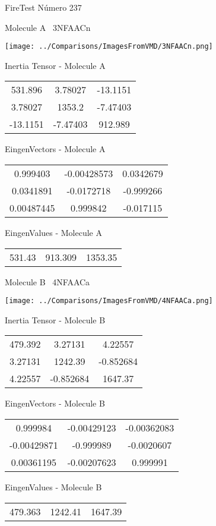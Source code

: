 \vtab[-3cm]
\begin{center}
{\large FireTest \tab Número 237}
\end{center}
\begin{multicols}{2}
\begin{center}

Molecule A \
3NFAACn

\texttt{[image: ../Comparisons/ImagesFromVMD/3NFAACn.png]}

Inertia Tensor - Molecule A \\
\begin{tabular}{|c c c|}
531.896	 & 	3.78027	 & 	-13.1151	 \\
3.78027	 & 	1353.2	 & 	-7.47403	 \\
-13.1151	 & 	-7.47403	 & 	912.989
\end{tabular}

\vtab
 EingenVectors - Molecule A     \\
\begin{tabular}{|c c c|}
0.999403	 & 	-0.00428573	 & 	0.0342679	 \\
0.0341891	 & 	-0.0172718	 & 	-0.999266	 \\
0.00487445	 & 	0.999842	 & 	-0.017115
\end{tabular}

\vtab
 EingenValues - Molecule A     \\
\begin{tabular}{|c c c|}
531.43	 & 	913.309	 & 	1353.35	 \\
\end{tabular}
\columnbreak

Molecule B \
4NFAACa

\texttt{[image: ../Comparisons/ImagesFromVMD/4NFAACa.png]}

Inertia Tensor - Molecule B \\
\begin{tabular}{|c c c|}
479.392	 & 	3.27131	 & 	4.22557	 \\
3.27131	 & 	1242.39	 & 	-0.852684	 \\
4.22557	 & 	-0.852684	 & 	1647.37
\end{tabular}

\vtab
 EingenVectors - Molecule B     \\
\begin{tabular}{|c c c|}
0.999984	 & 	-0.00429123	 & 	-0.00362083	 \\
-0.00429871	 & 	-0.999989	 & 	-0.0020607	 \\
0.00361195	 & 	-0.00207623	 & 	0.999991
\end{tabular}

\vtab
 EingenValues - Molecule B     \\
\begin{tabular}{|c c c|}
479.363	 & 	1242.41	 & 	1647.39	 \\
\end{tabular}

\end{center}
\end{multicols}

